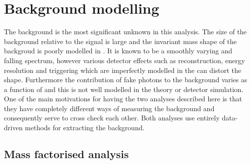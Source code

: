 \section{Background modelling}
\label{sec:background_model}

The background is the most significant unknown in this analysis. The size of the background relative to the signal is large and the invariant mass shape of the backgroud is poorly modelled in \MC. It is known to be a smoothly varying and falling spectrum, however various detector effects such as reconstruction, energy resolution and triggering which are imperfectly modelled in the \MC can distort the shape. Furthermore the contribution of fake photons to the background varies as a function of \mgg and this is not well modelled in the theory or detector simulation. One of the main motivations for having the two analyses described here is that they have completely different ways of measuring the background and consequently serve to cross check each other. Both analyses use entirely data-driven methods for extracting the background.  

\subsection{Mass factorised analysis}
\label{sec:envelope}

